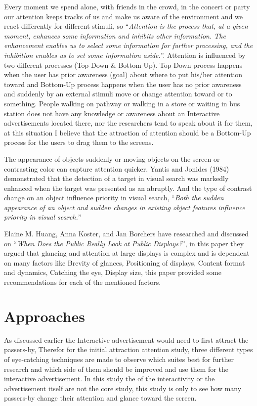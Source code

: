 Every moment we spend alone, with friends in the crowd, in the concert or party our attention keeps tracks of us and make us aware of the environment and we react differently for different stimuli, so ``\emph{Attention is the process that, at a given moment, enhances some information and inhibits other information. The enhancement enables us to select some information for further processing, and the inhibition enables us to set some information aside.}''\cite{Attention}. Attention is influenced by two different processes (Top-Down \& Bottom-Up). Top-Down process happens when the user has prior awareness (goal) about where to put his/her attention toward and Bottom-Up process happens when the user has no prior awareness and suddenly by an external stimuli move or change attention toward or to something. People walking on pathway or walking in a store or waiting in bus station does not have any knowledge or awareness about an Interactive advertisements located there, nor the researchers tend to speak about it for them, at this situation I believe that the attraction of attention should be a Bottom-Up process for the users to drag them to the screens.

The appearance of objects suddenly or moving objects on the screen or contrasting color can capture attention quicker. Yantis and Jonides (1984) demonstrated that the detection of a target in visual search was markedly enhanced when the target was presented as an abruptly\cite{capturingattention}. And the type of contrast change on an object influence priority in visual search, ``\emph{Both the sudden appearance of an object and sudden changes in existing object features influence priority in visual search.}''\cite{Luminance}

Elaine M. Huang, Anna Koster, and Jan Borchers have researched and discussed on ``\emph{When Does the Public Really Look at Public Displays?}''\cite{WhenPublicDisplays}, in this paper they argued that glancing and attention at large displays is complex and is dependent on many factors like Brevity of glances, Positioning of displays, Content format and dynamics, Catching the eye, Display size, this paper provided some recommendations for each of the mentioned factors.

\section{Approaches}
As discussed earlier the Interactive advertisement would need to first attract the passers-by, Therefor for the initial attraction attention study, three different types of eye-catching techniques are made to observe which suites best for further research and which side of them should be improved and use them for the interactive advertisement. In this study the of the interactivity or the advertisement itself are not the core study, this study is only to see how many passers-by change their attention and glance toward the screen. 

